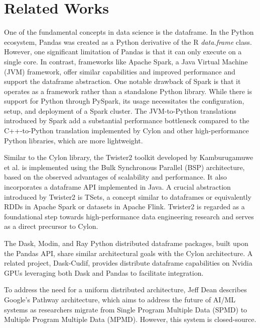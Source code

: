 \section{Related Works} \label{sec:relatedWorks}

One of the fundamental concepts in data science is the dataframe. In the Python ecosystem, Pandas\cite{mckinney2011pandas} was created as a Python derivative of the R \textit{data.frame} class. However, one significant limitation of Pandas is that it can only execute on a single core. In contrast, frameworks like Apache Spark, a Java Virtual Machine (JVM) framework, offer similar capabilities and improved performance and support the dataframe abstraction. One notable drawback of Spark is that it operates as a framework rather than a standalone Python library. While there is support for Python through PySpark, its usage necessitates the configuration, setup, and deployment of a Spark cluster. The JVM-to-Python translations introduced by Spark add a substantial performance bottleneck compared to the C++-to-Python translation implemented by Cylon and other high-performance Python libraries, which are more lightweight\cite{abeykoon2020data}.

Similar to the Cylon library, the Twister2 toolkit developed by Kamburugamuwe et al. is implemented using the Bulk Synchronous Parallel (BSP) architecture, based on the observed advantages of scalability and performance. It also incorporates a dataframe API implemented in Java\cite{perera2023depth}. A crucial abstraction introduced by Twister2 is TSets, a concept similar to dataframes or equivalently RDDs in Apache Spark or datasets in Apache Flink. Twister2 is regarded as a foundational step towards high-performance data engineering research and serves as a direct precursor to Cylon\cite{pererathesis}.

The Dask, Modin, and Ray Python distributed dataframe packages, built upon the Pandas API, share similar architectural goals with the Cylon architecture.   A related project, Dask-Cudif, provides distribute dataframe capabilities on Nvidia GPUs leveraging both Dask and Pandas to facilitate integration\cite{perera2023depth}.

To address the need for a uniform distributed architecture, Jeff Dean describes Google’s Pathway architecture, which aims to address the future of AI/ML systems as researchers migrate from Single Program Multiple Data (SPMD) to Multiple Program Multiple Data (MPMD). However, this system is closed-source.

